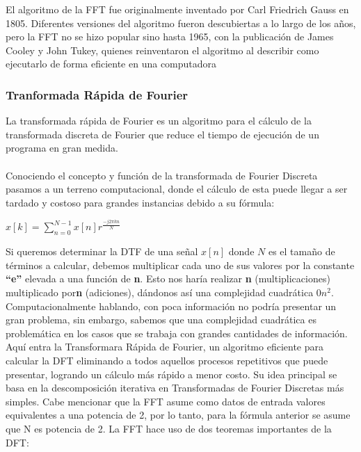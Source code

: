 \documentclass{article}
\begin{document}
El algoritmo de la FFT fue originalmente inventado por Carl Friedrich Gauss en 1805. Diferentes versiones
del algoritmo fueron descubiertas a lo largo de los años, pero la FFT no se hizo popular sino hasta 1965, con la
publicación de James Cooley y John Tukey, quienes reinventaron el algoritmo al describir como ejecutarlo de
forma eficiente en una computadora

\subsubsection{Tranformada Rápida de Fourier}

La transformada rápida de Fourier es un algoritmo para el cálculo de la transformada discreta de Fourier que reduce el tiempo de ejecución de un programa en gran medida.\\
\\

Conociendo el concepto y función de la transformada de Fourier Discreta pasamos a un terreno computacional, donde el cálculo de esta puede llegar a ser tardado y costoso para grandes instancias debido a su fórmula:\\
\begin{center}
    $x[k]=\sum_{n=0}^{N-1}x[n]r^{\frac{-j2\pi kn}{N}}$\\
\end{center}
Si queremos determinar la DTF de una señal $x[n]$ donde $N$ es el tamaño de términos a calcular, debemos multiplicar cada uno de sus valores por la constante \textbf{“e”} elevada a una función de \textbf{n}. Esto nos haría realizar \textbf{n} (multiplicaciones) multiplicado por\textbf{n} (adiciones), dándonos así una complejidad cuadrática $0n^{2}$. Computacionalmente hablando, con poca información no podría presentar un gran problema, sin embargo, sabemos que una complejidad cuadrática es problemática en los casos que se trabaja con grandes cantidades de información. \\

Aquí entra la Transformara Rápida de Fourier, un algoritmo eficiente para calcular la DFT eliminando a todos aquellos procesos repetitivos que puede presentar, logrando un cálculo más rápido a menor costo. Su idea principal se basa en la descomposición iterativa en Transformadas de Fourier Discretas más simples. Cabe mencionar que la FFT asume como datos de entrada valores equivalentes a una potencia de 2, por lo tanto, para la fórmula anterior se asume que N es potencia de 2. 
La FFT hace uso de dos teoremas importantes de la DFT:
\end{document}
